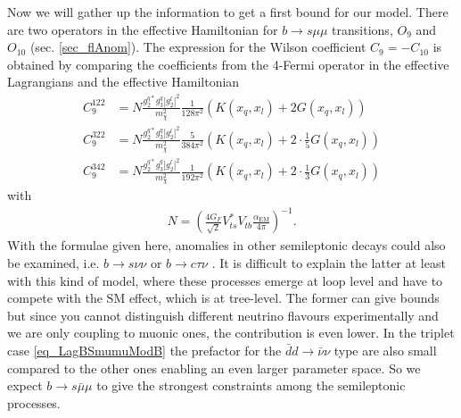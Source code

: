 \noindent Now we will gather up the information to get a first bound for our model. There are two operators in the effective Hamiltonian for $b\rightarrow s\mu\mu$
transitions, $O_9$ and $O_{10}$ (sec. \ref{sec_flAnom}). The expression for the Wilson coefficient $C_9 = -C_{10}$ \cite{1408.1627} is obtained by comparing the 
coefficients from the 4-Fermi operator in the effective Lagrangians and the effective Hamiltonian
\begin{align}
 C_9^{122} &= N \frac{g_2^{q*}g_3^q|g_2^l|^2}{m_\chi^2} \frac{1}{128\pi^2} \left(K(x_q,x_l) + 2G(x_q,x_l)\right)\label{eq_WilsonBsmumu122}\\
 C_9^{{322}} &= N \frac{g_2^{q*}g_3^q|g_2^l|^2}{m_\chi^2} \frac{5}{384\pi^2} \left(K(x_q,x_l) + 2\cdot\frac15 G(x_q,x_l)\right)\\
 C_9^{{342}} &= N \frac{g_2^{q*}g_3^q|g_2^l|^2}{m_\chi^2} \frac{1}{192\pi^2} \left(K(x_q,x_l) + 2\cdot\frac13 G(x_q,x_l)\right)
 \label{eq_WilsonBsmumu342}
\end{align}
with
\begin{align}
 N = \left(\frac{4G_F}{\sqrt{2}} V_{ts}^*V_{tb} \frac{\alpha_\text{EM}}{4\pi}\right)^{-1}.
\end{align}
With the formulae given here, anomalies in other semileptonic decays could also be examined, i.e. $b \rightarrow s\nu\nu$ \cite{1409.4557} or 
$b \rightarrow c\tau\nu$ \cite{1507.03233}. 
It is difficult to explain the latter at least with this kind of model, where these processes emerge at loop level and have to compete with the 
SM effect, which is at tree-level. The former can give bounds but since you cannot distinguish different neutrino flavours experimentally
and we are only coupling to muonic ones, the contribution is even lower. In the triplet case \eqref{eq_LagBSmumuModB} the prefactor
for the $\bar dd\rightarrow \bar\nu\nu$ type
are also small compared to the other ones enabling an even larger parameter space. So we expect $b\rightarrow s\bar \mu \mu$ 
to give the strongest constraints among the semileptonic processes.






